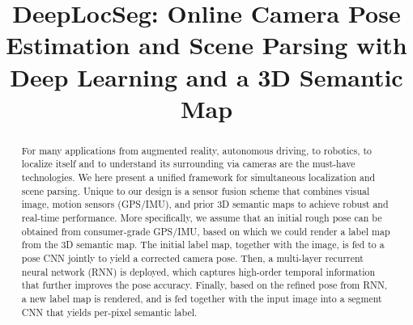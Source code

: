 \documentclass[10pt,twocolumn,letterpaper]{article}
\makeatletter
\DeclareRobustCommand\onedot{\futurelet\@let@token\@onedot}
\def\onedot{\ifx\@let@token.\else.\null\fi\xspace}
\def\eg{\emph{e.g.}}
\def\etc{\emph{etc}\onedot}
\makeatother
\begin{document}
\title{DeepLocSeg: Online Camera Pose Estimation and Scene Parsing with Deep Learning and a 3D Semantic Map}

\maketitle

\begin{abstract}

For many applications from augmented reality, autonomous driving, to robotics, to localize itself and to understand its surrounding via cameras are the must-have technologies. We here present a unified framework for simultaneous localization and scene parsing. Unique to our design is a sensor fusion scheme that combines visual image, motion sensors (GPS/IMU), and prior 3D semantic maps to achieve robust and real-time performance. More specifically, we assume that an initial rough pose can be obtained from consumer-grade GPS/IMU, based on which we could render a label map from the 3D semantic map. The initial label map, together with the image, is fed to a pose CNN jointly to yield a corrected camera pose.
Then, a multi-layer recurrent neural network (RNN) is deployed, which captures high-order temporal information that further improves the pose accuracy.
Finally, based on the refined pose from RNN, a new label map is rendered, and is fed together with the input image into a segment CNN that yields per-pixel semantic label. 


\end{abstract}
\end{document}

